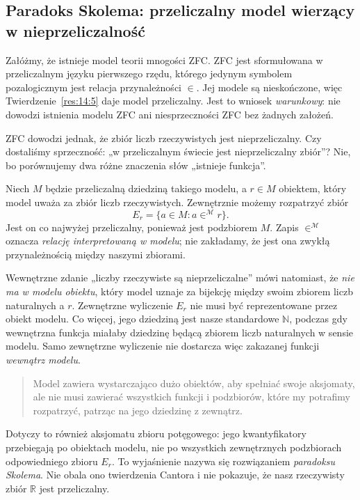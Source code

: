 \subsection*{Paradoks Skolema: przeliczalny model wierzący w nieprzeliczalność}\label{sec:15:3}
Załóżmy, że istnieje model teorii mnogości ZFC. ZFC jest sformułowana w przeliczalnym języku pierwszego rzędu, którego jedynym symbolem pozalogicznym jest relacja przynależności $\in$. Jej modele są nieskończone, więc Twierdzenie~\ref{res:14:5} daje model przeliczalny. Jest to wniosek \emph{warunkowy}: nie dowodzi istnienia modelu ZFC ani niesprzeczności ZFC bez żadnych założeń.

ZFC dowodzi jednak, że zbiór liczb rzeczywistych jest nieprzeliczalny. Czy dostaliśmy sprzeczność: „w przeliczalnym świecie jest nieprzeliczalny zbiór”? Nie, bo porównujemy dwa różne znaczenia słów „istnieje funkcja”.

Niech $M$ będzie przeliczalną dziedziną takiego modelu, a $r\in M$ obiektem, który model uważa za zbiór liczb rzeczywistych. Zewnętrznie możemy rozpatrzyć zbiór
\[
E_r=\{a\in M:a\mathrel{\in^{\mathcal M}}r\}.
\]
Jest on co najwyżej przeliczalny, ponieważ jest podzbiorem $M$. Zapis $\in^{\mathcal M}$ oznacza \emph{relację interpretowaną w modelu}; nie zakładamy, że jest ona zwykłą przynależnością między naszymi zbiorami.

Wewnętrzne zdanie „liczby rzeczywiste są nieprzeliczalne” mówi natomiast, że \emph{nie ma w modelu obiektu}, który model uznaje za bijekcję między swoim zbiorem liczb naturalnych a $r$. Zewnętrzne wyliczenie $E_r$ nie musi być reprezentowane przez obiekt modelu. Co więcej, jego dziedziną jest nasze standardowe $\mathbb N$, podczas gdy wewnętrzna funkcja miałaby dziedzinę będącą zbiorem liczb naturalnych w sensie modelu. Samo zewnętrzne wyliczenie nie dostarcza więc zakazanej funkcji \emph{wewnątrz modelu}.

\begin{quote}
Model zawiera wystarczająco dużo obiektów, aby spełniać swoje aksjomaty, ale nie musi zawierać wszystkich funkcji i podzbiorów, które my potrafimy rozpatrzyć, patrząc na jego dziedzinę z zewnątrz.
\end{quote}

Dotyczy to również aksjomatu zbioru potęgowego: jego kwantyfikatory przebiegają po obiektach modelu, nie po wszystkich zewnętrznych podzbiorach odpowiedniego zbioru $E_r$. To wyjaśnienie nazywa się rozwiązaniem \emph{paradoksu Skolema}. Nie obala ono twierdzenia Cantora i nie pokazuje, że nasz rzeczywisty zbiór $\mathbb R$ jest przeliczalny.

